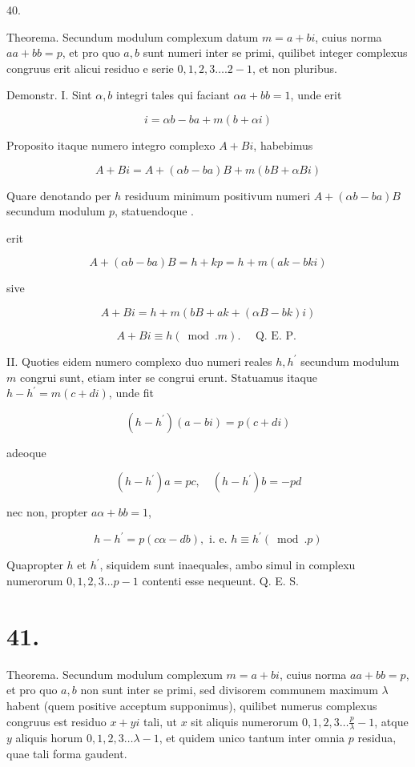 \documentclass[10pt]{article}
\begin{document}
40.

Theorema. Secundum modulum complexum datum \(m=a+b i\), cuius norma \(a a+b b=p\), et pro quo \(a, b\) sunt numeri inter se primi, quilibet integer complexus congruus erit alicui residuo e serie \(0,1,2,3 \ldots .2-1\), et non pluribus.

Demonstr. I. Sint \(\alpha, b\) integri tales qui faciant \(\alpha a+b b=1\), unde erit

\[
i=\alpha b-b a+m(b+\alpha i)
\]

Proposito itaque numero integro complexo \(A+B i\), habebimus

\[
A+B i=A+(\alpha b-b a) B+m(b B+\alpha B i)
\]

Quare denotando per \(h\) residuum minimum positivum numeri \(A+(\alpha b-b a) B\) secundum modulum \(p\), statuendoque .

erit

\[
A+(\alpha b-b a) B=h+k p=h+m(a k-b k i)
\]

sive

\[
A+B i=h+m(b B+a k+(\alpha B-b k) i)
\]

\[
A+B i \equiv h(\bmod . m) . \quad \text { Q. E. P. }
\]

II. Quoties eidem numero complexo duo numeri reales \(h, h^{\prime}\) secundum modulum \(m\) congrui sunt, etiam inter se congrui erunt. Statuamus itaque \(h-h^{\prime}=m(c+d i)\), unde fit

\[
\left(h-h^{\prime}\right)(a-b i)=p(c+d i)
\]

adeoque

\[
\left(h-h^{\prime}\right) a=p c, \quad\left(h-h^{\prime}\right) b=-p d
\]

nec non, propter \(a \alpha+b b=1\),

\[
h-h^{\prime}=p(c \alpha-d b), \text { i. e. } h \equiv h^{\prime}(\bmod . p)
\]

Quapropter \(h\) et \(h^{\prime}\), siquidem sunt inaequales, ambo simul in complexu numerorum \(0,1,2,3 \ldots p-1\) contenti esse nequeunt. Q. E. S.

\section*{41.}
Theorema. Secundum modulum complexum \(m=a+b i\), cuius norma \(a a+b b=p\), et pro quo \(a, b\) non sunt inter se primi, sed divisorem communem maximum \(\lambda\) habent (quem positive acceptum supponimus), quilibet numerus complexus congruus est residuo \(x+y i\) tali, ut \(x\) sit aliquis numerorum \(0,1,2,3 \ldots \frac{p}{\lambda}-1\), atque \(y\) aliquis horum \(0,1,2,3 \ldots \lambda-1\), et quidem unico tantum inter omnia \(p\) residua, quae tali forma gaudent.
\end{document}
